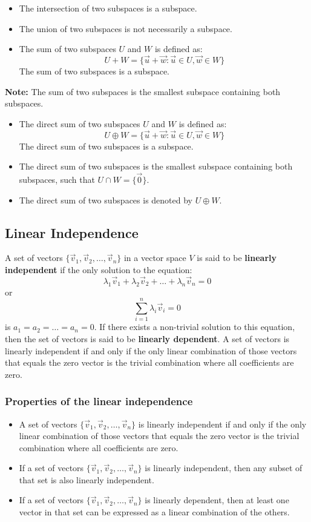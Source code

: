 \begin{itemize}[label=$-$]
	\item The intersection of two subspaces is a subspace.
	\item The union of two subspaces is not necessarily a subspace.
	\item The sum of two subspaces $U$ and $W$ is defined as:
	      \[
		      U + W = \{\vec{u} + \vec{w} : \vec{u} \in U, \vec{w} \in W\}
	      \]
	      The sum of two subspaces is a subspace.
\end{itemize}
\textbf{Note:} The sum of two subspaces is the smallest subspace containing both subspaces.
\begin{itemize}[label=$-$]
	\item The direct sum of two subspaces $U$ and $W$ is defined as:
	      \[
		      U \oplus W = \{\vec{u} + \vec{w} : \vec{u} \in U, \vec{w} \in W\}
	      \]
	      The direct sum of two subspaces is a subspace.
	\item The direct sum of two subspaces is the smallest subspace containing both subspaces, such that $U \cap W = \{\vec{0}\}$.
	\item The direct sum of two subspaces is denoted by $U \oplus W$.
\end{itemize}

\subsection{Linear Independence}

A set of vectors $\{\vec{v}_1, \vec{v}_2, \ldots, \vec{v}_n\}$ in a vector space $V$ is said to be \textbf{linearly independent} if the only solution to the equation:
\[
	\lambda_1\vec{v}_1 + \lambda_2\vec{v}_2 + \ldots + \lambda_n\vec{v}_n = 0
\]
or
\[
	\sum_{i=1}^n \lambda_i \vec{v}_i = 0
\]
is $a_1 = a_2 = \ldots = a_n = 0$.
If there exists a non-trivial solution to this equation, then the set of vectors is said to be \textbf{linearly dependent}.
A set of vectors is linearly independent if and only if the only linear combination of those vectors that equals the zero vector is the trivial combination where all coefficients are zero.

\subsubsection{Properties of the linear independence}

\begin{itemize}[label=$-$]
	\item A set of vectors $\{\vec{v}_1, \vec{v}_2, \ldots, \vec{v}_n\}$ is linearly independent if and only if the only linear combination of those vectors that equals the zero vector is the trivial combination where all coefficients are zero.
	\item If a set of vectors $\{\vec{v}_1, \vec{v}_2, \ldots, \vec{v}_n\}$ is linearly independent, then any subset of that set is also linearly independent.
	\item If a set of vectors $\{\vec{v}_1, \vec{v}_2, \ldots, \vec{v}_n\}$ is linearly dependent, then at least one vector in that set can be expressed as a linear combination of the others.
\end{itemize}

